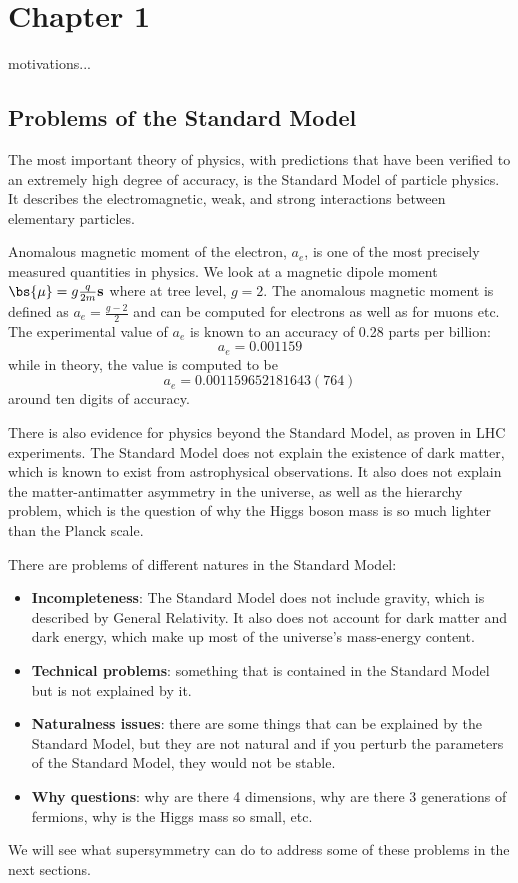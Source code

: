 \chapter{Chapter 1}

motivations...

\section{Problems of the Standard Model}

The most important theory of physics, with predictions that have been verified to an extremely high degree of accuracy, is the Standard Model of particle physics. It describes the electromagnetic, weak, and strong interactions between elementary particles.

Anomalous magnetic moment of the electron, $a_e$, is one of the most precisely measured quantities in physics. We look at a magnetic dipole moment \(\bs{\mu} = g\frac{q}{2m}\mathbf{s}\) where at tree level, \(g = 2\). The anomalous magnetic moment is defined as \(a_e = \frac{g-2}{2}\) and can be computed for electrons as well as for muons etc. The experimental value of \(a_e\) is known to an accuracy of 0.28 parts per billion:
\[
    a_e = 0.001159
\]
while in theory, the value is computed to be
\[
    a_e = 0.001159652181643(764)
\]
around ten digits of accuracy.

There is also evidence for physics beyond the Standard Model, as proven in LHC experiments. The Standard Model does not explain the existence of dark matter, which is known to exist from astrophysical observations. It also does not explain the matter-antimatter asymmetry in the universe, as well as the hierarchy problem, which is the question of why the Higgs boson mass is so much lighter than the Planck scale.

There are problems of different natures in the Standard Model:
\begin{itemize}
    \item \textbf{Incompleteness}: The Standard Model does not include gravity, which is described by General Relativity. It also does not account for dark matter and dark energy, which make up most of the universe's mass-energy content.
    \item \textbf{Technical problems}: something that is contained in the Standard Model but is not explained by it.
    \item \textbf{Naturalness issues}: there are some things that can be explained by the Standard Model, but they are not natural and if you perturb the parameters of the Standard Model, they would not be stable.
    \item \textbf{Why questions}: why are there 4 dimensions, why are there 3 generations of fermions, why is the Higgs mass so small, etc.
\end{itemize}
We will see what supersymmetry can do to address some of these problems in the next sections.

